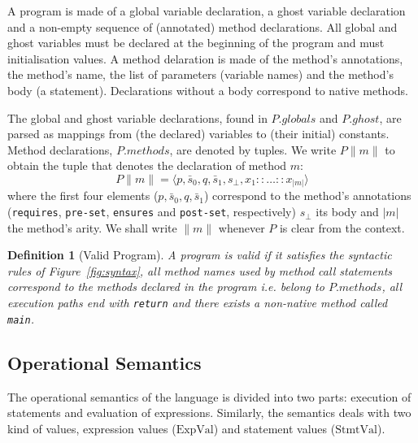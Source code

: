 \documentclass[10pt,notitlepage,twoside]{article}
\newtheorem{definition}{Definition}
\begin{document}



A program is made of a global variable declaration, a ghost variable declaration and  a non-empty sequence of (annotated) method declarations.
All global and ghost variables must be declared at the beginning of the program and must initialisation values.
A method delaration is made of the method's annotations, the method's name, the list of parameters (variable names) and the method's body (a statement). Declarations without a body correspond to native methods. 



The global and ghost variable declarations, found in $P.\mathit{globals}$ and  $P.\mathit{ghost}$,  are parsed as mappings from (the declared) variables to (their initial) constants.
Method declarations, $P.\mathit{methods}$, are denoted by tuples. We write $P\|m\|$ to obtain the tuple that denotes the declaration of method $m$:
\begin{displaymath}
P\|m\| = \langle p,\bar{s}_0,q,\bar{s}_1,s_\bot,x_1 :: \ldots ::x_{|m|} \rangle
\end{displaymath}
where the first four elements ($p,\bar{s}_0,q,\bar{s}_1$) correspond to the method's annotations (\texttt{requires}, \texttt{pre-set}, \texttt{ensures} and \texttt{post-set}, respectively) $s_\bot$ its body and $|m|$  the method's arity. 
We shall write $\|m\|$ whenever $P$ is clear from the context. 

\begin{definition}[Valid Program]
A program is valid if it satisfies the syntactic rules of Figure~\ref{fig:syntax}, all method names used by method call statements correspond to the methods declared in the program i.e. belong to $P.\mathit{methods}$, all execution paths end with \texttt{return} and there exists a non-native method called \texttt{main}.
\end{definition}



\subsection{Operational Semantics} \label{sec:opsem}


The operational semantics of the language is divided into two parts: execution of statements and evaluation of expressions. Similarly, the semantics deals with two kind of values, expression values ($\textrm{ExpVal}$) and statement values ($\textrm{StmtVal}$).
\end{document}
